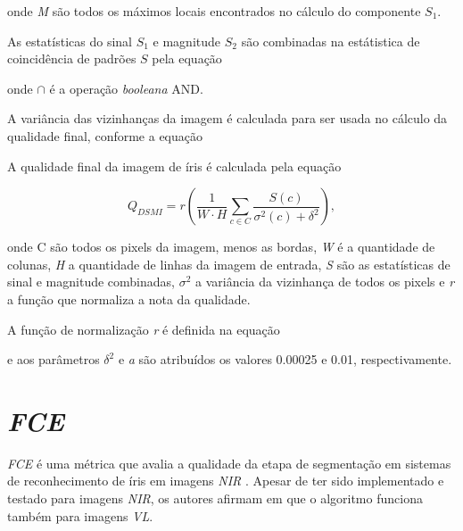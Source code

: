 
\noindent onde \textit{M} são todos os máximos locais encontrados no cálculo do componente $S_{1}$.

\par As estatísticas do sinal \textit{$S_{1}$} e magnitude \textit{$S_{2}$} são combinadas na estátistica de coincidência de padrões $S$ pela equação


\noindent onde $\cap$ é a operação \textit{booleana} AND.

\par A variância das vizinhanças da imagem é calculada para ser usada no cálculo da qualidade final, conforme a equação



\par A qualidade final da imagem de íris é calculada pela equação 

\begin{equation}\label{eq:dsmi:Q}
  Q_{DSMI} = r(\frac{1}{W\cdot H}\sum_{c \in C}\frac{S(c)}{\sigma^2(c) + \delta^2}),
\end{equation}

\noindent onde C são todos os pixels da imagem, menos as bordas, \textit{W} é a quantidade de colunas, \textit{H} a quantidade de linhas da imagem de entrada, \textit{S} são as estatísticas de sinal e magnitude combinadas, $\sigma^{2}$ a variância da vizinhança de todos os pixels e \textit{r} a função que normaliza a nota da qualidade.

\par A função de normalização \textit{r} é definida na equação 

\equacao{eq:dsmi:r}{
    r : [0, \infty) \to [0, 1) \quad x \mapsto 1 - e^{-ax}
}

\noindent e aos parâmetros $\delta^2$ e \textit{a} são atribuídos os valores 0.00025 e 0.01, respectivamente.


\section{\textit{\acrfull{FCE}}} \label{sec:revisao:fce}

\par \textit{\acrfull{FCE}} é uma métrica que avalia a qualidade da etapa de segmentação em sistemas de reconhecimento de íris em imagens \textit{\acrfull{NIR}} \cite{du2010}. Apesar de ter sido implementado e testado para imagens \textit{\acrshort{NIR}}, os autores afirmam em \cite{zhou2012} que o algoritmo funciona também para imagens \textit{\acrshort{VL}}. 

